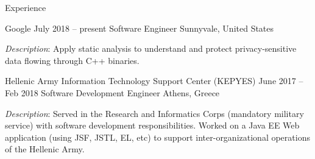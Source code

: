 \documentclass{resume}
\begin{document}
\newcommand{\mytilde}{\raise.17ex\hbox{$\scriptstyle\mathtt{\sim}$}}



\begin{rSection}{Experience}

\begin{rSubsection}
  {Google}
  {July 2018 -- present}
  {Software Engineer}
  {Sunnyvale, United States}
\item \emph{Description}: Apply static analysis to understand and
  protect privacy-sensitive data flowing through C++ binaries.
\end{rSubsection}

\begin{rSubsection}
  {Hellenic Army Information Technology Support Center (KEPYES)}
  {June 2017 -- Feb 2018}
  {Software Development Engineer}
  {Athens, Greece}
\item \emph{Description}: Served in the Research and Informatics Corps
  (mandatory military service) with software development
  responsibilities. Worked on a Java EE Web application (using JSF,
  JSTL, EL, etc) to support inter-organizational operations of the
  Hellenic Army.
\end{rSubsection}



\end{rSection}
\end{document}
